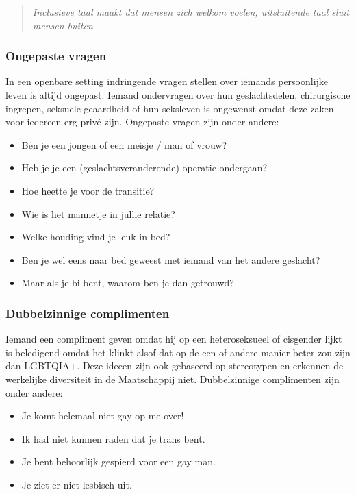 \documentclass[12pt,openany]{book}
\begin{document}
\begin{quote}
\textit{Inclusieve taal maakt dat mensen zich welkom voelen, uitsluitende taal sluit mensen buiten}
\end{quote}

\subsubsection*{Ongepaste vragen}

In een openbare setting indringende vragen stellen over iemands persoonlijke leven is altijd ongepast. Iemand ondervragen over hun geslachtsdelen, chirurgische ingrepen, seksuele geaardheid of hun seksleven is ongewenst omdat deze zaken voor iedereen erg privé zijn. Ongepaste vragen zijn onder andere: 

\begin{itemize}
  \setlength\itemsep{0em}
  \item Ben je een jongen of een meisje / man of vrouw?
  \item Heb je je een (geslachtsveranderende) operatie ondergaan?
  \item Hoe heette je voor de transitie?
  \item Wie is het mannetje in jullie relatie?
  \item Welke houding vind je leuk in bed?
  \item Ben je wel eens naar bed geweest met iemand van het andere geslacht?
  \item Maar als je bi bent, waarom ben je dan getrouwd?
\end{itemize}

\subsubsection*{Dubbelzinnige complimenten}

Iemand een compliment geven omdat hij op een heteroseksueel of cisgender lijkt is beledigend omdat het klinkt alsof dat op de een of andere manier beter zou zijn dan LGBTQIA+. Deze ideeen zijn ook gebaseerd op stereotypen en erkennen de werkelijke diversiteit in de Maatschappij niet. Dubbelzinnige complimenten zijn onder andere: 

\begin{itemize}
  \setlength\itemsep{0em}
  \item Je komt helemaal niet gay op me over!
  \item Ik had niet kunnen raden dat je trans bent.
  \item Je bent behoorlijk gespierd voor een gay man.
  \item Je ziet er niet lesbisch uit.
\end{itemize}
\end{document}
